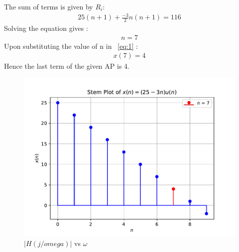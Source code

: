 \documentclass[journal,12pt,twocolumn]{IEEEtran}
\theoremstyle{remark}
\begin{document}
The sum of terms is given by $R_i$:
 \begin{align}
25(n+1)	+ \frac{-3}{2} n(n+1) = 116 
 \end{align}
Solving the equation gives :
\begin{align}
	n=7
\end{align}
Upon substituting the value of n in ~\ref{eq:1} :
\begin{align}
	x(7)=4
\end{align}
Hence the last term of the given AP is 4.
\begin{figure}[h!]
	\centering
	\includegraphics[width=\columnwidth]{figs/stem_plot.pdf}
	\caption{$|H(j/omega)|$ vs $\omega$}
	\label{fig:plot}
\end{figure}
\end{document}
